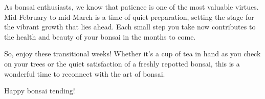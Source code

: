 \medskip
{}
\noindent
As bonsai enthusiasts, we know that patience is one of the most valuable virtues.
Mid\--February to mid\--March is a time of quiet preparation, setting the stage for the vibrant growth that lies ahead.
Each small step you take now contributes to the health and beauty of your bonsai in the months to come.

So, enjoy these transitional weeks!
Whether it's a cup of tea in hand as you check on your trees or the quiet satisfaction of a freshly repotted bonsai, this is a wonderful time to reconnect with the art of bonsai.

Happy bonsai tending!
\closearticle
\clearpage
